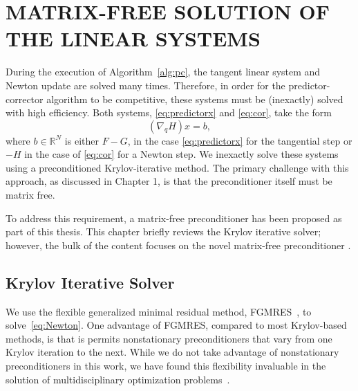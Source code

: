  
\chapter{MATRIX-FREE SOLUTION OF THE LINEAR SYSTEMS}\label{chap:linsys}
During the execution of Algorithm~\ref{alg:pc}, the tangent linear system and
Newton update are solved many times.  Therefore, in order for the
predictor-corrector algorithm to be competitive, these systems must be
(inexactly) solved with high efficiency.  Both systems, \eqref{eq:predictorx}
and \eqref{eq:cor}, take the form
\begin{equation}\label{eq:linsys}
  (\nabla_q H) x = b,
\end{equation}
where $b \in
\mathbb{R}^{N}$ is either $F - G$, in the case \eqref{eq:predictorx} for the tangential step or $-H$ in the case of \eqref{eq:cor} for a Newton step.  We inexactly solve these systems using a preconditioned
Krylov-iterative method.  The primary challenge with this approach, as discussed
in Chapter 1, is that the preconditioner itself must be matrix free.

To address this requirement, a matrix-free preconditioner has been proposed as part of this thesis. This chapter  briefly reviews the Krylov iterative solver; however, the bulk of the content focuses on the novel matrix-free preconditioner . 

\section{Krylov Iterative Solver}\label{2:krylov}
We use the flexible generalized minimal residual method,
FGMRES~\cite{Saad1993fgmres}, to solve~\eqref{eq:Newton}.  One advantage of
FGMRES, compared to most Krylov-based methods, is that is permits nonstationary
preconditioners that vary from one Krylov iteration to the next.  While we do
not take advantage of nonstationary preconditioners in this work, we have found
this flexibility invaluable in the solution of multidisciplinary optimization
problems~\cite{dener:idf2017, dener:2014}.


